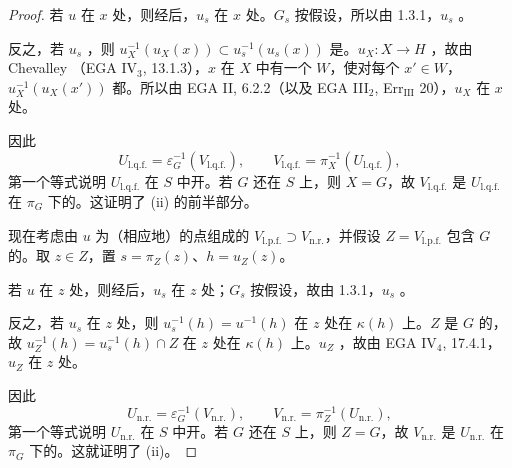 \begin{proof}
若 $u$ 在 $x$ 处，则经后，$u_s$ 在 $x$ 处。$G_s$ 按假设，所以由 1.3.1，$u_s$ 。

反之，若 $u_s$ ，则 $u_X^{-1}(u_X(x))\subset u_s^{-1}(u_s(x))$ 是。$u_X:X\to H$ ，故由 Chevalley （EGA IV$_3$, 13.1.3），$x$ 在 $X$ 中有一个 $W$，使对每个 $x'\in W$， $u_X^{-1}(u_X(x'))$ 都。所以由 EGA II, 6.2.2（以及 EGA III$_2$, Err$_{\mathrm{III}}$ 20），$u_X$ 在 $x$ 处。

因此
\[
U_{\mathrm{l.q.f.}}=\varepsilon_G^{-1}(V_{\mathrm{l.q.f.}}),\qquad
V_{\mathrm{l.q.f.}}=\pi_X^{-1}(U_{\mathrm{l.q.f.}}),
\]
第一个等式说明 $U_{\mathrm{l.q.f.}}$ 在 $S$ 中开。若 $G$ 还在 $S$ 上，则 $X=G$，故 $V_{\mathrm{l.q.f.}}$ 是 $U_{\mathrm{l.q.f.}}$ 在 $\pi_G$ 下的。这证明了 (ii) 的前半部分。

现在考虑由 $u$ 为（相应地）的点组成的 $V_{\mathrm{l.p.f.}}\supset V_{\mathrm{n.r.}}$，并假设 $Z=V_{\mathrm{l.p.f.}}$ 包含 $G$ 的。取 $z\in Z$，置 $s=\pi_Z(z)$、$h=u_Z(z)$。

若 $u$ 在 $z$ 处，则经后，$u_s$ 在 $z$ 处；$G_s$ 按假设，故由 1.3.1，$u_s$ 。

反之，若 $u_s$ 在 $z$ 处，则 $u_s^{-1}(h)=u^{-1}(h)$ 在 $z$ 处在 $\kappa(h)$ 上。$Z$ 是 $G$ 的，故 $u_Z^{-1}(h)=u_s^{-1}(h)\cap Z$ 在 $z$ 处在 $\kappa(h)$ 上。$u_Z$ ，故由 EGA IV$_4$, 17.4.1，$u_Z$ 在 $z$ 处。

因此
\[
U_{\mathrm{n.r.}}=\varepsilon_G^{-1}(V_{\mathrm{n.r.}}),\qquad
V_{\mathrm{n.r.}}=\pi_Z^{-1}(U_{\mathrm{n.r.}}),
\]
第一个等式说明 $U_{\mathrm{n.r.}}$ 在 $S$ 中开。若 $G$ 还在 $S$ 上，则 $Z=G$，故 $V_{\mathrm{n.r.}}$ 是 $U_{\mathrm{n.r.}}$ 在 $\pi_G$ 下的。这就证明了 (ii)。
\end{proof}

